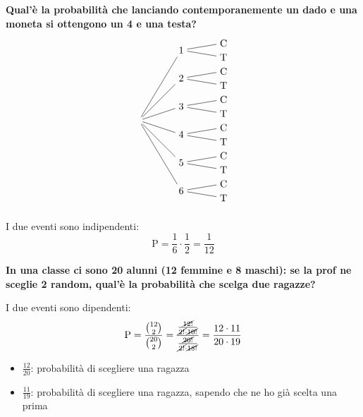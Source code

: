 \textbf{Qual'è la probabilità che lanciando contemporanemente un dado e una moneta si ottengono un 4 e una testa?}
\[
    \begin{tikzpicture}[
    level 1/.style={sibling distance=1cm},
    level 2/.style={sibling distance=0.5cm},
    grow=right, 
    sloped
    ]
    \node {}
        child {node {6}
        child {node {T}}
        child {node {C}}
        }
        child {node {5}
        child {node {T}}
        child {node {C}}
        }
        child {node {4}
        child {node {T}}
        child {node {C}}
        }
        child {node {3}
        child {node {T}}
        child {node {C}}
        }
        child {node {2}
        child {node {T}}
        child {node {C}}
        }
        child {node {1}
        child {node {T}}
        child {node {C}}
        };
    \end{tikzpicture}
\]

I due eventi sono indipendenti:
\begin{equation*}
    \mathrm{P} = \frac{1}{6} \cdot \frac{1}{2} = \frac{1}{12}
\end{equation*}


\textbf{In una classe ci sono 20 alunni (12 femmine e 8 maschi): se la prof ne sceglie 2 random, qual'è la probabilità che scelga due ragazze?}

I due eventi sono dipendenti:
\begin{equation*}
\mathrm{P} = \frac{\binom{12}{2}}{\binom{20}{2}} = \frac{\frac{\cancel{12!}}{\cancel{2!} \cdot \cancel{10!}}}{\frac{\cancel{20!}}{\cancel{2!} \cdot \cancel{18!}}} = \frac{12 \cdot 11}{20 \cdot 19}
\end{equation*}

\begin{itemize}[label=$\Rightarrow$]
\item $\frac{12}{20}$: probabilità di scegliere una ragazza
\medskip
\item $\frac{11}{19}$: probabilità di scegliere una ragazza, sapendo che ne ho già scelta una prima
\end{itemize}

